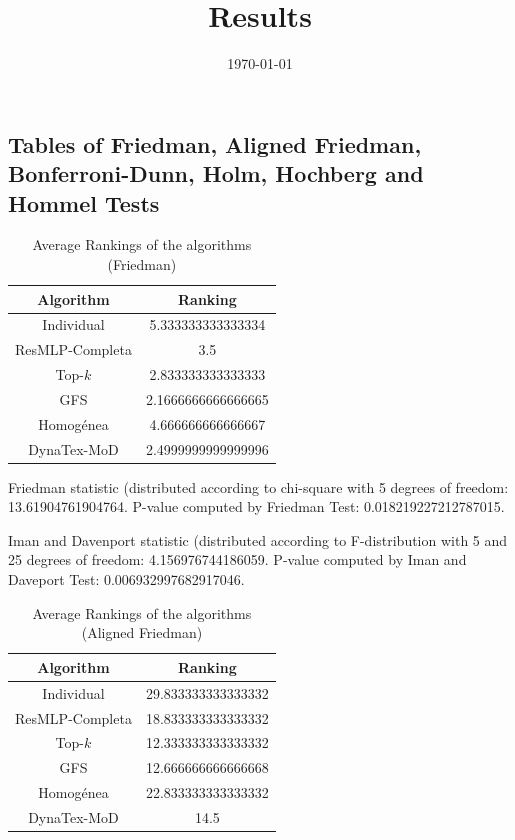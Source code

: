 \documentclass[a4paper,10pt]{article}
\title{Results}
\author{}
\date{\today}
\begin{document}
\begin{landscape}
\oddsidemargin 0in \topmargin 0in\maketitle
\section{Tables of Friedman, Aligned Friedman, Bonferroni-Dunn, Holm, Hochberg and Hommel Tests}
\begin{table}[!htp]
\centering
\caption{Average Rankings of the algorithms (Friedman)
}\begin{tabular}{c|c}
Algorithm&Ranking\\
\hline
Individual&5.333333333333334\\
ResMLP-Completa&3.5\\
Top-$k$&2.833333333333333\\
GFS&2.1666666666666665\\
Homogénea&4.666666666666667\\
DynaTex-MoD&2.4999999999999996\\
\end{tabular}
\end{table}


Friedman statistic (distributed according to chi-square with 5 degrees of freedom: 13.61904761904764. 
P-value computed by Friedman Test: 0.018219227212787015.\newline

Iman and Davenport statistic (distributed according to F-distribution with 5 and 25 degrees of freedom: 4.156976744186059. 
P-value computed by Iman and Daveport Test: 0.006932997682917046.\newline


\newpage

\begin{table}[!htp]
\centering
\caption{Average Rankings of the algorithms (Aligned Friedman)
}\begin{tabular}{c|c}
Algorithm&Ranking\\
\hline
Individual&29.833333333333332\\
ResMLP-Completa&18.833333333333332\\
Top-$k$&12.333333333333332\\
GFS&12.666666666666668\\
Homogénea&22.833333333333332\\
DynaTex-MoD&14.5\\
\end{tabular}
\end{table}



\end{landscape}
\end{document}
